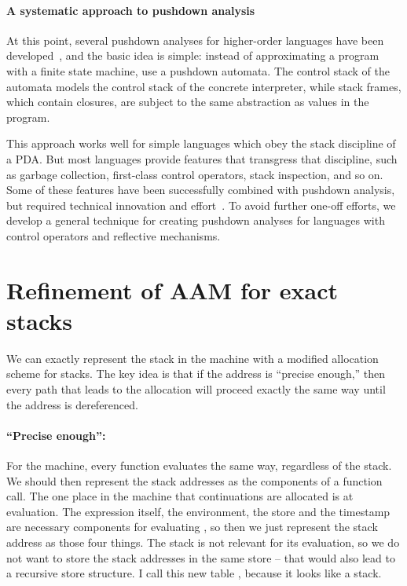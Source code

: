 \paragraph{A systematic approach to pushdown analysis}

At this point, several pushdown analyses for higher-order languages
have been developed~\cite{dvanhorn:Vardoulakis2011CFA2,
dvanhorn:Earl2010Pushdown}, and the basic idea is simple: instead of
approximating a program with a finite state machine, use a pushdown
automata.  The control stack of the automata models the control stack
of the concrete interpreter, while stack frames, which contain
closures, are subject to the same abstraction as values in the
program.

This approach works well for simple languages which obey the stack
discipline of a PDA.  But most languages provide features that
transgress that discipline, such as garbage collection, first-class
control operators, stack inspection, and so on.  Some of these
features have been successfully combined with pushdown analysis, but
required technical innovation and
effort~\cite{dvanhorn:Vardoulakis2011Pushdown,
ianjohnson:DBLP:journals/jfp/JohnsonSEMH14,
dvanhorn:Earl2012Introspective}.  To avoid further one-off efforts, we
develop a general technique for creating pushdown analyses for
languages with control operators and reflective mechanisms.

\section{Refinement of AAM for exact stacks}\label{sec:pushdown}
We can exactly represent the stack in the  machine with a modified allocation scheme for stacks.
The key idea is that if the address is ``precise enough,'' then every path that leads to the allocation will proceed exactly the same way until the address is dereferenced.


\paragraph{``Precise enough'':}
For the  machine, every function evaluates the same way, regardless of the stack.
We should then represent the stack addresses as the components of a function call.
The one place in the  machine that continuations are allocated is at  evaluation.
The expression itself, the environment, the store and the timestamp are necessary components for evaluating , so then we just represent the stack address as those four things.
The stack is not relevant for its evaluation, so we do not want to store the stack addresses in the same store -- that would also lead to a recursive store structure.
I call this new table , because it looks like a stack.



